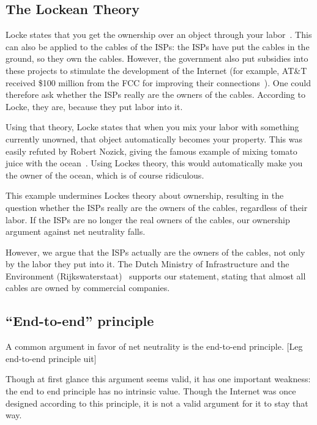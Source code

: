 
\subsection{The Lockean Theory}
Locke states that you get the ownership over an object through your labor~\cite{tuckness2012locke}.
This can also be applied to the cables of the \acp{ISP}: the \acp{ISP} have put the cables in the ground, so they own the cables.
However, the government also put subsidies into these projects to stimulate the development of the Internet (for example, AT\&T received \$100 million from the FCC for improving their connections~\cite{bode2013att}).
One could therefore ask whether the \acp{ISP} really are the owners of the cables.
According to Locke, they are, because they put labor into it.

Using that theory, Locke states that when you mix your labor with something currently unowned, that object automatically becomes your property.
This was easily refuted by Robert Nozick, giving the famous example of mixing tomato juice with the ocean~\cite{tuckness2012locke}.
Using Lockes theory, this would automatically make you the owner of the ocean, which is of course ridiculous.

This example undermines Lockes theory about ownership, resulting in the question whether the \acp{ISP} really are the owners of the cables, regardless of their labor.
If the \acp{ISP} are no longer the real owners of the cables, our ownership argument against net neutrality falls.

However, we argue that the \acp{ISP} actually are the owners of the cables, not only by the labor they put into it.
The Dutch Ministry of Infrastructure and the Environment (Rijkswaterstaat)~\cite{rws2014kabels} supports our statement, stating that almost all cables are owned by commercial companies.

\subsection{``End-to-end'' principle}
A common argument in favor of net neutrality is the end-to-end principle. [Leg end-to-end principle uit] \cite{iskander2010end}

Though at first glance this argument seems valid, it has one important weakness: the end to end principle has no intrinsic value. Though the Internet was once designed according to this principle, it is not a valid argument for it to stay that way.

